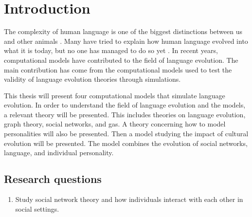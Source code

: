 \acresetall
\chapter{Introduction}
The complexity of human language is one of the biggest distinctions between us and other animals \citep{hauser2002faculty}. Many have tried to explain how human language evolved into what it is today, but no one has managed to do so yet \citep{chomsky1986knowledge, pinker1990natural, muller1861theoretical}. In recent years, computational models have contributed to the field of language evolution. The main contribution has come from the computational models used to test the validity of language evolution theories through simulations.

This thesis will present four computational models that simulate language evolution. In order to understand the field of language evolution and the models, a relevant theory will be presented. This includes theories on language evolution, graph theory, social networks, and \acp{ga}. A theory concerning how to model personalities will also be presented. Then a model studying the impact of cultural evolution will be presented. The model combines the evolution of social networks, language, and individual personality.


\section{Research questions}
\begin{centering}
    \begin{enumerate}
        \item Study social network theory and how individuals interact with each other in social settings.
    \end{enumerate}
\end{centering}

